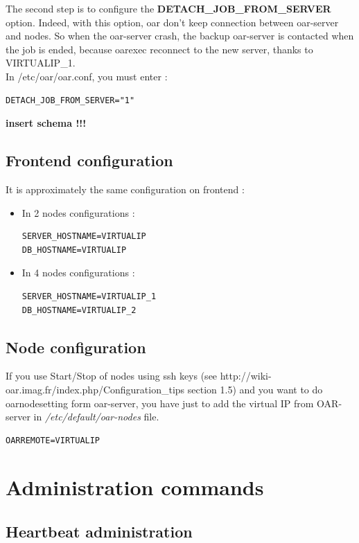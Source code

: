 \documentclass[a4paper,10pt]{report}
\begin{document}
The second step is to configure the \textbf{DETACH\_JOB\_FROM\_SERVER} option. Indeed, with this option, oar don't keep connection between oar-server and nodes.
So when the oar-server crash, the backup oar-server is contacted when the job is ended, because oarexec reconnect to the new server, thanks to VIRTUALIP\_1.\\
In /etc/oar/oar.conf, you must enter :
\begin{lstlisting}
DETACH_JOB_FROM_SERVER="1"
\end{lstlisting}

\textbf{insert schema !!!}

\subsection{Frontend configuration}
\label{frontendconf}
It is approximately the same configuration on frontend :\\
\begin{itemize}
 \item In 2 nodes configurations :
\begin{lstlisting}
SERVER_HOSTNAME=VIRTUALIP
DB_HOSTNAME=VIRTUALIP
\end{lstlisting}
\item In 4 nodes configurations :
\begin{lstlisting}
SERVER_HOSTNAME=VIRTUALIP_1
DB_HOSTNAME=VIRTUALIP_2
\end{lstlisting}
\end{itemize}

\subsection{Node configuration}
\label{nodeconf}
If you use Start/Stop of nodes using ssh keys (see http://wiki-oar.imag.fr/index.php/Configuration\_tips section 1.5) and you want to do oarnodesetting form oar-server, 
you have just to add the virtual IP from OAR-server in \textit{/etc/default/oar-nodes} file.
\begin{lstlisting}
OARREMOTE=VIRTUALIP
\end{lstlisting}

\section{Administration commands}

\subsection{Heartbeat administration}
\end{document}
